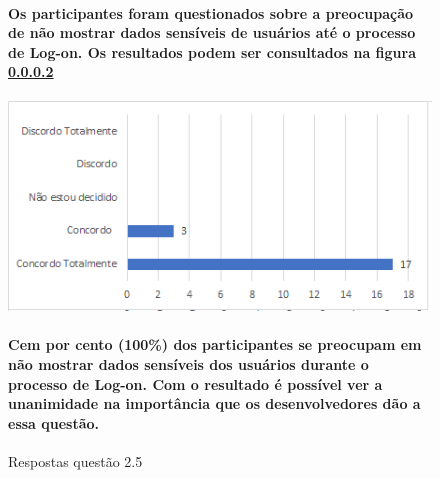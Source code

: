 \begin{figure}[!t]
\centering

\paragraph{
Os participantes foram questionados sobre a preocupação de não mostrar dados sensíveis de usuários até o processo de Log-on. Os resultados podem ser consultados na figura \ref{fig:2.5}
}

\includegraphics[scale=0.7]{figuras das questoes/2.5.png}
\caption{Respostas questão 2.5}

\paragraph{
Cem por cento (100{\%}) dos participantes se preocupam em não mostrar dados sensíveis dos usuários durante o processo de Log-on. Com o resultado é possível ver a unanimidade na importância que os desenvolvedores dão a essa questão.
}
\label{fig:2.5}
\end{figure}
